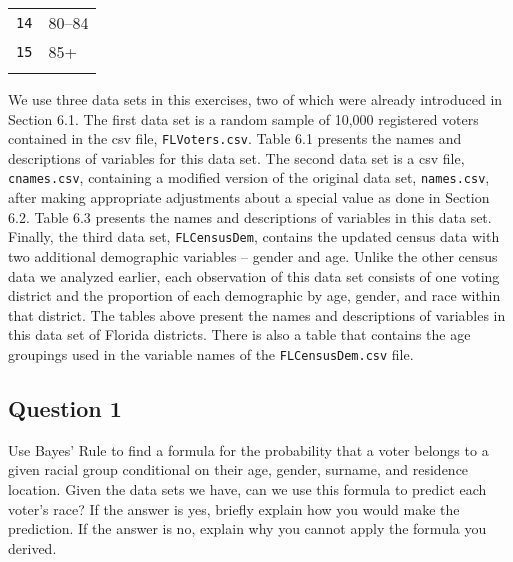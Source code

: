 \documentclass[]{article}
\begin{document}
\begin{longtable}[c]{@{}ll@{}}
\\\addlinespace
\begin{minipage}[t]{0.24\columnwidth}\raggedright
\texttt{14}
\end{minipage} & \begin{minipage}[t]{0.69\columnwidth}\raggedright
80--84
\end{minipage}
\\\addlinespace
\begin{minipage}[t]{0.24\columnwidth}\raggedright
\texttt{15}
\end{minipage} & \begin{minipage}[t]{0.69\columnwidth}\raggedright
85+
\end{minipage}
\\\addlinespace
\bottomrule
\end{longtable}

We use three data sets in this exercises, two of which were already
introduced in Section 6.1. The first data set is a random sample of
10,000 registered voters contained in the csv file,
\texttt{FLVoters.csv}. Table 6.1 presents the names and descriptions of
variables for this data set. The second data set is a csv file,
\texttt{cnames.csv}, containing a modified version of the original data
set, \texttt{names.csv}, after making appropriate adjustments about a
special value as done in Section 6.2. Table 6.3 presents the names and
descriptions of variables in this data set. Finally, the third data set,
\texttt{FLCensusDem}, contains the updated census data with two
additional demographic variables -- gender and age. Unlike the other
census data we analyzed earlier, each observation of this data set
consists of one voting district and the proportion of each demographic
by age, gender, and race within that district. The tables above present
the names and descriptions of variables in this data set of Florida
districts. There is also a table that contains the age groupings used in
the variable names of the \texttt{FLCensusDem.csv} file.

\subsection{Question 1}\label{question-1}

Use Bayes' Rule to find a formula for the probability that a voter
belongs to a given racial group conditional on their age, gender,
surname, and residence location. Given the data sets we have, can we use
this formula to predict each voter's race? If the answer is yes, briefly
explain how you would make the prediction. If the answer is no, explain
why you cannot apply the formula you derived.
\end{document}

